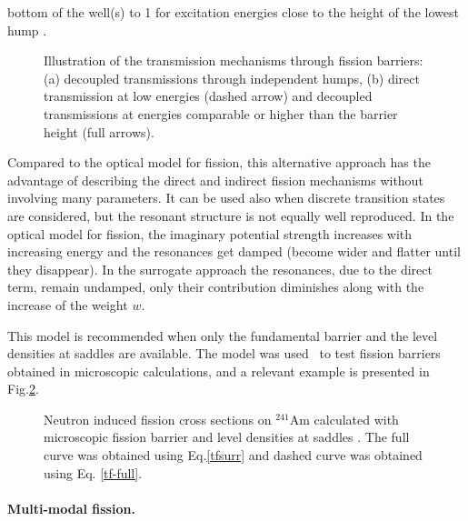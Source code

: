 bottom of the well(s) to 1 for excitation energies close to the height of
the lowest hump \cite{Sin:07}.
\begin{figure}[htbp]
\caption{Illustration of the transmission mechanisms through fission
barriers: (a) decoupled transmissions through independent humps, (b) direct
transmission at low energies (dashed arrow) and decoupled transmissions at
energies comparable or higher than the barrier height (full arrows).}
\label{fis-ld0.eps}
\end{figure}
Compared to the optical model for fission, this alternative approach has the
advantage of describing the direct and indirect fission mechanisms without
involving many parameters. It can be used also when discrete transition
states are considered, but the resonant structure is not equally well
reproduced. In the optical model for fission,  the
imaginary potential strength increases with increasing energy
and the resonances get damped (become
wider and flatter until they disappear). In the surrogate approach the
resonances, due to the direct term, remain undamped, only their
contribution diminishes along with the increase of the weight $w$.

This model is recommended when only the
fundamental barrier and the level densities at saddles are available. The
model was used~\cite{Sin:07} to test fission barriers obtained in microscopic calculations,
and a relevant example is presented in Fig.\ref{am41-surr}.
\begin{figure}[htbp]
\caption{Neutron induced fission cross sections on $^{241}$Am calculated with
microscopic fission barrier \protect\cite{Goriely:07-mass} and level
densities at saddles \protect\cite{Goriely:07-ld}. The full curve was
obtained using Eq.\protect\ref{tfsurr} and dashed curve was obtained using Eq.%
\protect\ref{tf-full}.}
\label{am41-surr}
\end{figure}

\medskip %

\paragraph*{Multi-modal fission.}

